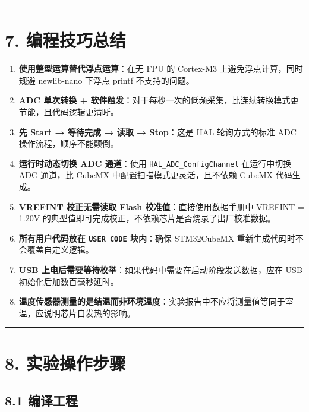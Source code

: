 \documentclass[
  chinese,
  UTF8,
  oneside,
  openany]{ctexbook}
\providecommand{\tightlist}{%
  \setlength{\itemsep}{0pt}\setlength{\parskip}{0pt}}
\begin{document}
\begin{center}\rule{0.5\linewidth}{0.5pt}\end{center}

\section{7. 编程技巧总结}\label{ux7f16ux7a0bux6280ux5de7ux603bux7ed3-1}

\begin{enumerate}
\def\labelenumi{\arabic{enumi}.}
\tightlist
\item
  \textbf{使用整型运算替代浮点运算}：在无 FPU 的 Cortex-M3
  上避免浮点计算，同时规避 newlib-nano 下浮点 printf 不支持的问题。
\item
  \textbf{ADC 单次转换 +
  软件触发}：对于每秒一次的低频采集，比连续转换模式更节能，且代码逻辑更清晰。
\item
  \textbf{先 Start → 等待完成 → 读取 → Stop}：这是 HAL 轮询方式的标准
  ADC 操作流程，顺序不能颠倒。
\item
  \textbf{运行时动态切换 ADC 通道}：使用
  \texttt{HAL\_ADC\_ConfigChannel} 在运行中切换 ADC 通道，比 CubeMX
  中配置扫描模式更灵活，且不依赖 CubeMX 代码生成。
\item
  \textbf{VREFINT 校正无需读取 Flash 校准值}：直接使用数据手册中 VREFINT
  = 1.20V 的典型值即可完成校正，不依赖芯片是否烧录了出厂校准数据。
\item
  \textbf{所有用户代码放在 \texttt{USER\ CODE} 块内}：确保 STM32CubeMX
  重新生成代码时不会覆盖自定义逻辑。
\item
  \textbf{USB
  上电后需要等待枚举}：如果代码中需要在启动阶段发送数据，应在 USB
  初始化后加数百毫秒延时。
\item
  \textbf{温度传感器测量的是结温而非环境温度}：实验报告中不应将测量值等同于室温，应说明芯片自发热的影响。
\end{enumerate}

\begin{center}\rule{0.5\linewidth}{0.5pt}\end{center}

\section{8. 实验操作步骤}\label{ux5b9eux9a8cux64cdux4f5cux6b65ux9aa4-1}

\subsection{8.1 编译工程}\label{ux7f16ux8bd1ux5de5ux7a0b-1}
\end{document}
